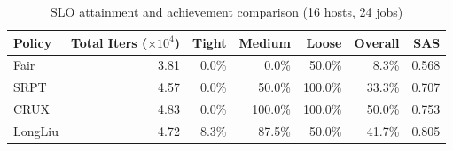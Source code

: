 \begin{table}[t]
\centering
\caption{SLO attainment and achievement comparison (16 hosts, 24 jobs)}
\label{tab:slo_16host}
\begin{tabular}{l|r|r|r|r|r|r}
\hline
Policy & Total Iters ($\times 10^4$) & Tight & Medium & Loose & Overall & SAS \\
\hline
Fair & 3.81 & 0.0\% & 0.0\% & 50.0\% & 8.3\% & 0.568 \\
SRPT & 4.57 & 0.0\% & 50.0\% & 100.0\% & 33.3\% & 0.707 \\
CRUX & 4.83 & 0.0\% & 100.0\% & 100.0\% & 50.0\% & 0.753 \\
LongLiu & 4.72 & 8.3\% & 87.5\% & 50.0\% & 41.7\% & 0.805 \\
\hline
\end{tabular}
\end{table}
